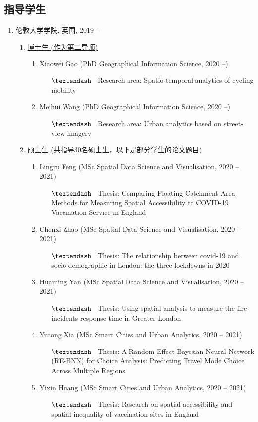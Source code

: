 \documentclass[A4,11pt]{article}
\newcommand{\MScStduentItem}[4]{
  \item #1 (#2, #3)
   \begin{itemize}
    \item[$\textendash$] \ #4
   \end{itemize}
}
\begin{document}
\begin{CJK*}{UTF8}{gbsn}
\section{指导学生}
\vspace{2mm}
\begin{enumerate}
   \item 伦敦大学学院, 英国, 2019 --
     \begin{enumerate}
       \item \underline{博士生 (作为第二导师)}
       \begin{enumerate}
           \item Xiaowei Gao (PhD Geographical Information Science, 2020 --)
           \begin{itemize}
            \item[$\textendash$] \ Research area: Spatio-temporal analytics of cycling mobility
           \end{itemize}
           \item Meihui Wang (PhD Geographical Information Science, 2020 --)
           \begin{itemize}
            \item[$\textendash$] \ Research area: Urban analytics based on street-view imagery
           \end{itemize}
       \end{enumerate}
       \item \underline{硕士生 (共指导30名硕士生，以下是部分学生的论文题目)}
       \begin{enumerate}
           \MScStduentItem{Lingru Feng}{MSc Spatial Data Science and Visualisation}{2020 -- 2021}
           {Thesis: Comparing Floating Catchment Area Methods for Measuring Spatial Accessibility to COVID-19 Vaccination Service in England}
           \MScStduentItem{Chenxi Zhao}{MSc Spatial Data Science and Visualisation}{2020 -- 2021}
           {Thesis: The relationship between covid-19 and socio-demographic in London: the three lockdowns in 2020}
           \MScStduentItem{Huaming Yan}{MSc Spatial Data Science and Visualisation}{2020 -- 2021}
           {Thesis: Using spatial analysis to measure the fire incidents response time in Greater London}
           \MScStduentItem{Yutong Xia}{MSc Smart Cities and Urban Analytics}{2020 -- 2021}
           {Thesis: A Random Effect Bayesian Neural Network (RE-BNN) for Choice Analysis: Predicting Travel Mode Choice Across Multiple Regions}
           \MScStduentItem{Yixin Huang}{MSc Smart Cities and Urban Analytics}{2020 -- 2021}
           {Thesis: Research on spatial accessibility and spatial inequality of vaccination sites in England}

\end{enumerate}
\end{enumerate}
\end{enumerate}
\end{CJK*}
\end{document}
